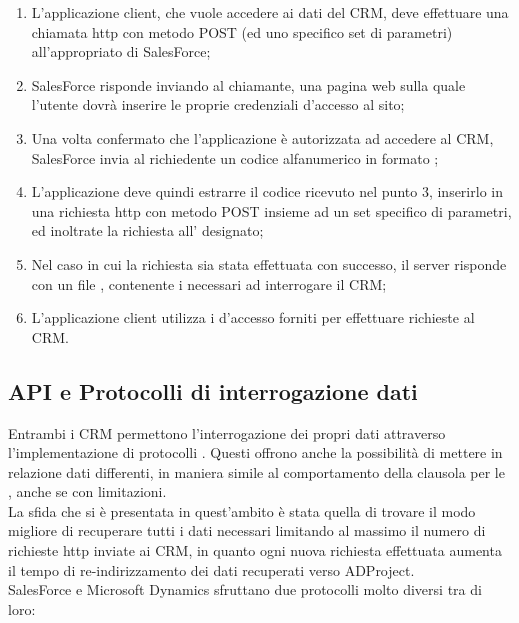 \documentclass[12pt,a4paper,twoside,openany,english]{book}
\begin{document}
			\begin{enumerate}
				\item L'applicazione client, che vuole accedere ai dati del \gls{CRM}, deve effettuare una chiamata \gls{http} con metodo POST (ed uno specifico set di parametri) all'appropriato  di SalesForce;
				\item SalesForce risponde inviando al chiamante, una pagina web sulla quale l'utente dovrà inserire le proprie credenziali d'accesso al sito; %
				\item Una volta confermato che l'applicazione è autorizzata ad accedere al \gls{CRM}, SalesForce invia al richiedente un codice alfanumerico in formato ;
				\item L'applicazione deve quindi estrarre il codice ricevuto nel punto 3, inserirlo in una richiesta \gls{http} con metodo POST insieme ad un set specifico di parametri, ed inoltrate la richiesta all' designato;
				\item Nel caso in cui la richiesta sia stata effettuata con successo, il server risponde con un file , contenente i  necessari ad interrogare il \gls{CRM};
				\item L'applicazione client utilizza i  d'accesso forniti per effettuare richieste al \gls{CRM}. 
			\end{enumerate}
		\subsection{API e Protocolli di interrogazione dati}
			Entrambi i \gls{CRM} permettono l'interrogazione dei propri dati attraverso l'implementazione di protocolli \textit{}. Questi offrono anche la possibilità di mettere in relazione dati differenti, in maniera simile al comportamento della clausola  per le  , anche se con limitazioni.\\ 
			La sfida che si è presentata in quest'ambito è stata quella di trovare il modo migliore di recuperare tutti i dati necessari limitando al massimo il numero di richieste \gls{http} inviate ai \gls{CRM}, in quanto ogni nuova richiesta effettuata aumenta il tempo di re-indirizzamento dei dati recuperati verso ADProject.
			~\\
			SalesForce e Microsoft Dynamics sfruttano due protocolli molto diversi tra di loro:
\end{document}
